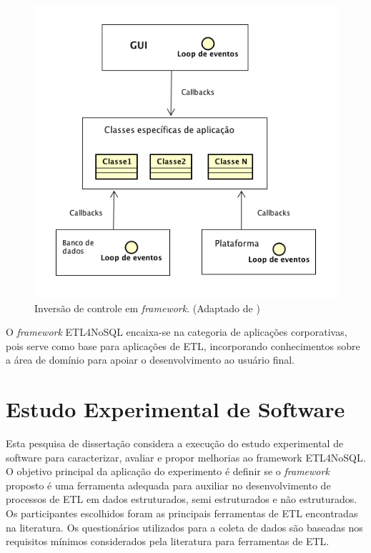 \begin{figure}[h!]
	\centering
	\includegraphics[scale=0.6]{fig/inversaodecontrole.png}
	\caption{Inversão de controle em \textit{framework}. (Adaptado de \cite{sommerville:2013})}
	\label{inversaodecontrole}
\end{figure}

O \textit{framework} ETL4NoSQL encaixa-se na categoria de aplicações corporativas, pois serve como base para aplicações de ETL, incorporando conhecimentos sobre a área de domínio para apoiar o desenvolvimento ao usuário final.




\section{Estudo Experimental de Software}

Esta pesquisa de dissertação considera a execução do estudo experimental de software para caracterizar, avaliar e propor melhorias ao framework ETL4NoSQL. O objetivo principal da aplicação do experimento é definir se o \textit{framework} proposto é uma ferramenta adequada para auxiliar no desenvolvimento de processos de ETL em dados estruturados, semi estruturados e não estruturados. Os participantes escolhidos foram as principais ferramentas de ETL encontradas na literatura. Os questionários utilizados para a coleta de dados são baseadas nos requisitos mínimos considerados pela literatura para ferramentas de ETL.

